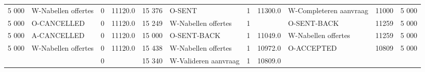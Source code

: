 \begin{tabular}{rlrlrlrllll}
5 000 & W-Nabellen offertes & 0 & 11120.0 & 15 376 & O-SENT & 1 & 11300.0 & W-Completeren aanvraag & 11000 & 5 000 \\
5 000 & O-CANCELLED & 0 & 11120.0 & 15 249 & W-Nabellen offertes & 1 &  & O-SENT-BACK & 11259 & 5 000 \\
5 000 & A-CANCELLED & 0 & 11120.0 & 15 000 & O-SENT-BACK & 1 & 11049.0 & W-Nabellen offertes & 11259 & 5 000 \\
5 000 & W-Nabellen offertes & 0 & 11120.0 & 15 438 & W-Nabellen offertes & 1 & 10972.0 & O-ACCEPTED & 10809 & 5 000 \\
 &  & 0 &  & 15 340 & W-Valideren aanvraag & 1 & 10809.0 &  &  &  \\
\bottomrule
\end{tabular}
